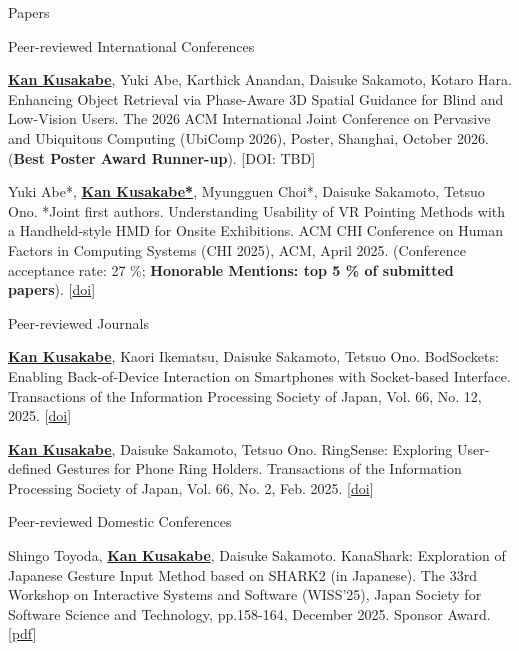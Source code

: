 \documentclass[
	11pt, %
]{resume} %
\begin{document}
\begin{rSection}{Papers}
    
	\begin{rSubsection}{Peer-reviewed International Conferences}{}{}{}
        \item \underline{\textbf{Kan Kusakabe}}, Yuki Abe, Karthick Anandan, Daisuke Sakamoto, Kotaro Hara. Enhancing Object Retrieval via Phase-Aware 3D Spatial Guidance for Blind and Low-Vision Users. The 2026 ACM International Joint Conference on Pervasive and Ubiquitous Computing (UbiComp 2026), Poster, Shanghai, October 2026. (\textbf{Best Poster Award Runner-up}). [DOI: TBD]
        \item Yuki Abe*, \underline{\textbf{Kan Kusakabe*}}, Myungguen Choi*, Daisuke Sakamoto, Tetsuo Ono. *Joint first authors. Understanding Usability of VR Pointing Methods with a Handheld-style HMD for Onsite Exhibitions. ACM CHI Conference on Human Factors in Computing Systems (CHI 2025), ACM, April 2025. (Conference acceptance rate: 27 \%; \textbf{Honorable Mentions: top 5 \% of submitted papers}). [\href{https://doi.org/10.1145/3706598.3713874}{doi}]
        
    \end{rSubsection}
    \begin{rSubsection}{Peer-reviewed Journals}{}{}{}
		\item \underline{\textbf{Kan Kusakabe}}, Kaori Ikematsu, Daisuke Sakamoto, Tetsuo Ono. BodSockets: Enabling Back-of-Device Interaction on Smartphones with Socket-based Interface. Transactions of the Information Processing Society of Japan, Vol. 66, No. 12, 2025. [\href{https://doi.org/10.20729/0002006344}{doi}]
        
		\item \underline{\textbf{Kan Kusakabe}}, Daisuke Sakamoto, Tetsuo Ono. RingSense: Exploring User-defined Gestures for Phone Ring Holders. Transactions of the Information Processing Society of Japan, Vol. 66, No. 2, Feb. 2025. [\href{https://doi.org/10.20729/0002000028}{doi}]
    \end{rSubsection}
    \begin{rSubsection}{Peer-reviewed Domestic Conferences}{}{}{}
		\item Shingo Toyoda, \underline{\textbf{Kan Kusakabe}}, Daisuke Sakamoto. KanaShark: Exploration of Japanese Gesture Input Method based on SHARK2 (in Japanese). The 33rd Workshop on Interactive Systems and Software (WISS'25), Japan Society for Software Science and Technology, pp.158-164, December 2025. Sponsor Award. [\href{https://www.wiss.org/WISS2025/downloads/proceedings.pdf}{pdf}]
        

\end{rSubsection}
\end{rSection}
\end{document}
